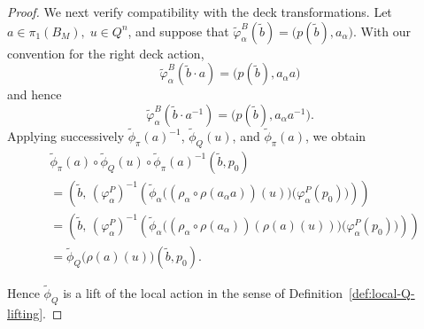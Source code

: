 \documentclass[10pt,a4paper]{amsart}
\begin{document}
\begin{proof}
We next verify compatibility with the deck transformations. Let $a\in\pi_1(B_M),\;
u\in Q^n$,
and suppose that $\widetilde\varphi_\alpha^B(\widetilde b)
=
\bigl(p(\widetilde b),a_\alpha\bigr)$.
With our convention for the right deck action,
\[
\widetilde\varphi_\alpha^B(\widetilde b\cdot a)
=
\bigl(p(\widetilde b),a_\alpha a\bigr)
\]
and hence
\[
\widetilde\varphi_\alpha^B(\widetilde b\cdot a^{-1})
=
\bigl(p(\widetilde b),a_\alpha a^{-1}\bigr).
\]
Applying successively
\(\widetilde\phi_\pi(a)^{-1}\),
\(\widetilde\phi_Q(u)\), and
\(\widetilde\phi_\pi(a)\), we obtain
\begin{align*}
&
\widetilde\phi_\pi(a)\circ
\widetilde\phi_Q(u)\circ
\widetilde\phi_\pi(a)^{-1}
(\widetilde b,p_0)
\\
&=
\left(
\widetilde b,\,
(\varphi_\alpha^P)^{-1}
\left(
\widetilde\phi_\alpha
\bigl(
(\rho_\alpha\circ\rho(a_\alpha a))(u)
\bigr)
\bigl(\varphi_\alpha^P(p_0)\bigr)
\right)
\right)
\\
&=
\left(
\widetilde b,\,
(\varphi_\alpha^P)^{-1}
\left(
\widetilde\phi_\alpha
\bigl(
(\rho_\alpha\circ\rho(a_\alpha))
(\rho(a)(u))
\bigr)
\bigl(\varphi_\alpha^P(p_0)\bigr)
\right)
\right)
\\
&=
\widetilde\phi_Q\bigl(\rho(a)(u)\bigr)
(\widetilde b,p_0).
\end{align*}

Hence \(\widetilde\phi_Q\) is a lift of the local action in the sense of Definition~\ref{def:local-Q-lifting}.


\end{proof}
\end{document}
